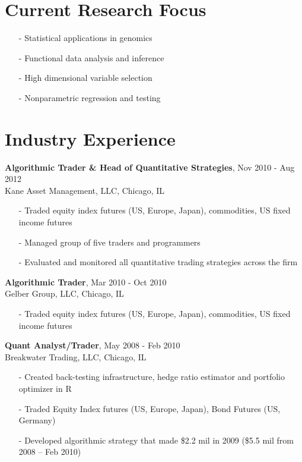 \documentclass[11pt]{res} %
\begin{document}
\begin{resume}
\section{Current Research Focus} 
\begin{itemize}[leftmargin=*] \itemsep -2pt %
\item[-]Statistical applications in genomics
\item[-]Functional data analysis and inference 
\item[-]High dimensional variable selection
\item[-]Nonparametric regression and testing
\end{itemize}

\section{Industry Experience} 
{\bf{Algorithmic Trader \& Head of Quantitative Strategies}}, \hfill Nov 2010 - Aug 2012 \\
Kane Asset Management, LLC, Chicago, IL
\noindent
\begin{itemize}[leftmargin=*] \itemsep -2pt %
\item[-] Traded equity index futures (US, Europe, Japan), commodities, US fixed income futures
\item[-] Managed group of five traders and programmers
\item[-] Evaluated and monitored all quantitative trading strategies across the firm
\end{itemize}

{\bf{Algorithmic Trader}}, \hfill Mar 2010 - Oct 2010 \\
Gelber Group, LLC, Chicago, IL
   \begin{itemize}[leftmargin=*] \itemsep -2pt %
   \item[-] Traded equity index futures (US, Europe, Japan), commodities, US fixed income futures
   \end{itemize}

{\bf{Quant Analyst/Trader}}, \hfill May 2008 - Feb 2010 \\
Breakwater Trading, LLC, Chicago, IL
   \begin{itemize}[leftmargin=*] \itemsep -2pt %
   \item[-] Created back-testing infrastructure, hedge ratio estimator and portfolio optimizer in R
   \item[-] Traded Equity Index futures (US, Europe, Japan), Bond Futures (US, Germany)
   \item[-] Developed algorithmic strategy that made \$2.2 mil in 2009 (\$5.5 mil from
2008 – Feb 2010)
   \end{itemize}


\end{resume}
\end{document}
